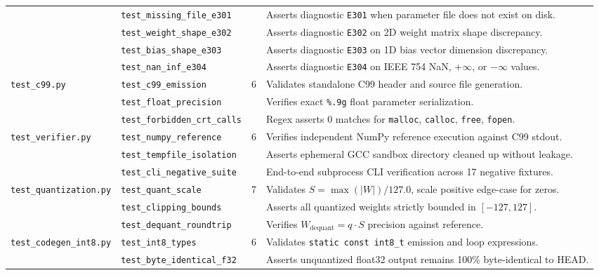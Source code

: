 \documentclass[11pt,a4paper]{article}
\begin{document}
\begin{table}[htbp]
\begin{tabular}{llcp{7.2cm}}
                          & \texttt{test\_missing\_file\_e301} & & Asserts diagnostic \texttt{E301} when parameter file does not exist on disk. \\
                          & \texttt{test\_weight\_shape\_e302} & & Asserts diagnostic \texttt{E302} on 2D weight matrix shape discrepancy. \\
                          & \texttt{test\_bias\_shape\_e303} & & Asserts diagnostic \texttt{E303} on 1D bias vector dimension discrepancy. \\
                          & \texttt{test\_nan\_inf\_e304} & & Asserts diagnostic \texttt{E304} on IEEE 754 NaN, $+\infty$, or $-\infty$ values. \\
\midrule
\texttt{test\_c99.py}     & \texttt{test\_c99\_emission} & 6 & Validates standalone C99 header and source file generation. \\
                          & \texttt{test\_float\_precision} & & Verifies exact \texttt{\%.9g} float parameter serialization. \\
                          & \texttt{test\_forbidden\_crt\_calls} & & Regex asserts 0 matches for \texttt{malloc}, \texttt{calloc}, \texttt{free}, \texttt{fopen}. \\
\midrule
\texttt{test\_verifier.py}& \texttt{test\_numpy\_reference} & 6 & Verifies independent NumPy reference execution against C99 stdout. \\
                          & \texttt{test\_tempfile\_isolation} & & Asserts ephemeral GCC sandbox directory cleaned up without leakage. \\
                          & \texttt{test\_cli\_negative\_suite} & & End-to-end subprocess CLI verification across 17 negative fixtures. \\
\midrule
\texttt{test\_quantization.py} & \texttt{test\_quant\_scale} & 7 & Validates $S = \max(|W|)/127.0$, scale positive edge-case for zeros. \\
                                & \texttt{test\_clipping\_bounds} & & Asserts all quantized weights strictly bounded in $[-127, 127]$. \\
                                & \texttt{test\_dequant\_roundtrip} & & Verifies $W_{\text{dequant}} = q \cdot S$ precision against reference. \\
\midrule
\texttt{test\_codegen\_int8.py}& \texttt{test\_int8\_types} & 6 & Validates \texttt{static const int8\_t} emission and loop expressions. \\
                                & \texttt{test\_byte\_identical\_f32} & & Asserts unquantized float32 output remains 100\% byte-identical to HEAD. \\

\end{tabular}
\end{table}
\end{document}
